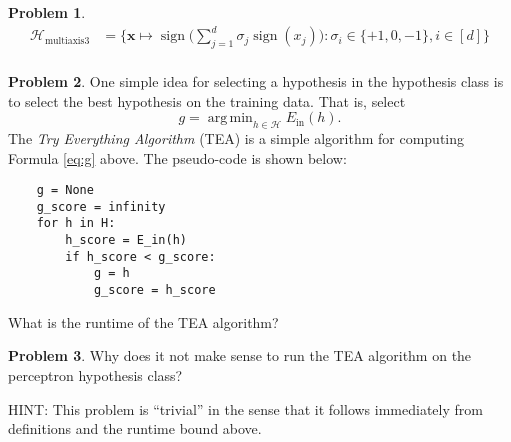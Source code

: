 \documentclass[10pt]{exam}
\theoremstyle{definition}
\newtheorem{problem}{Problem}
\DeclareMathOperator{\sign}{sign}
\DeclareMathOperator*{\argmin}{arg\,min}
\newcommand{\Ein}{E_{\text{in}}}
\newcommand{\x}{\mathbf x}
\newcommand{\lone}[1]{{\lVert {#1} \rVert}_1}
\newcommand{\ltwo}[1]{{\lVert {#1} \rVert}_2}
\newcommand{\lp}[1]{{\lVert {#1} \rVert}_p}
\newcommand{\HH}[1]{\mathcal H_{\text{#1}}}
\begin{document}
\begin{problem}
\begin{align*}
    \HH{multiaxis3} &= \bigg\{ \x \mapsto \sign\bigg(\sum_{j=1}^d \sigma_j \sign(x_j) \bigg): \sigma_i \in \{+1, 0, -1\}, i \in [d] \bigg\}  \\
\end{align*}
\end{problem}

\newpage
\begin{problem}
    One simple idea for selecting a hypothesis in the hypothesis class is to select the best hypothesis on the training data.
    That is, select
    \begin{equation}
        \label{eq:g}
        g = \argmin_{h\in\mathcal H} \Ein(h)
        .
    \end{equation}
    The \emph{Try Everything Algorithm} (TEA) is a simple algorithm for computing Formula \ref{eq:g} above.
    The pseudo-code is shown below:
    \begin{lstlisting}
    g = None
    g_score = infinity
    for h in H:
        h_score = E_in(h)
        if h_score < g_score:
            g = h
            g_score = h_score
    \end{lstlisting}
    What is the runtime of the TEA algorithm?
\end{problem}

\vspace{3in}
\begin{problem}
    Why does it not make sense to run the TEA algorithm on the perceptron hypothesis class?

    HINT: This problem is ``trivial'' in the sense that it follows immediately from definitions and the runtime bound above.
\end{problem}

\newpage
\noindent
\end{document}
